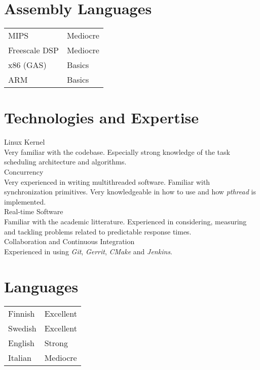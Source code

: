 \documentclass[12pt]{article}
\begin{document}

\section*{Assembly Languages}

\begin{tabular}{ll}
MIPS & Mediocre\\
Freescale DSP & Mediocre\\
x86 (GAS) & Basics\\
ARM & Basics\\
\end{tabular}


\section*{Technologies and Expertise}

\large{Linux Kernel}\\
\normalsize{Very familiar with the codebase. Especially strong knowledge of the
task scheduling architecture and algorithms.}\\

\large{Concurrency}\\
\normalsize{Very experienced in writing multithreaded software. Familiar with
synchronization primitives. Very knowledgeable in how to use and how
\emph{pthread} is implemented.}\\

\large{Real-time Software}\\
\normalsize{Familiar with the academic litterature. Experienced in considering,
measuring and tackling problems related to predictable response times.}\\

\large{Collaboration and Continuous Integration}\\
\normalsize{Experienced in using \emph{Git}, \emph{Gerrit}, \emph{CMake} and
\emph{Jenkins}.}


\section*{Languages}
\begin{tabular}{ll}
Finnish & Excellent\\
Swedish & Excellent\\
English & Strong\\
Italian & Mediocre\\
\end{tabular}
\end{document}
